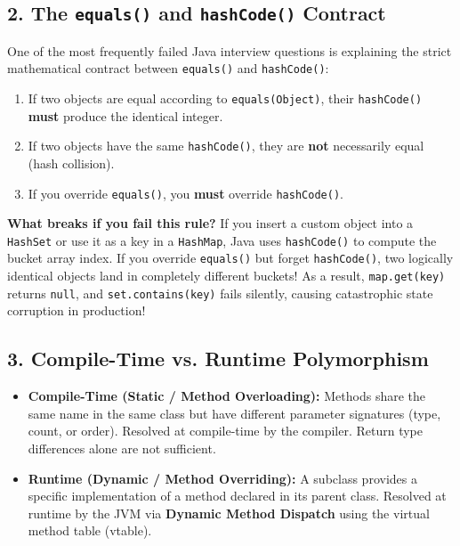\documentclass[10pt,journal,compsoc,onecolumn]{IEEEtran}
\begin{document}
\subsection{2. The \texttt{equals()} and \texttt{hashCode()} Contract}
One of the most frequently failed Java interview questions is explaining the strict mathematical contract between \texttt{equals()} and \texttt{hashCode()}:
\begin{enumerate}
    \item If two objects are equal according to \texttt{equals(Object)}, their \texttt{hashCode()} \textbf{must} produce the identical integer.
    \item If two objects have the same \texttt{hashCode()}, they are \textbf{not} necessarily equal (hash collision).
    \item If you override \texttt{equals()}, you \textbf{must} override \texttt{hashCode()}.
\end{enumerate}

\textbf{What breaks if you fail this rule?}
If you insert a custom object into a \texttt{HashSet} or use it as a key in a \texttt{HashMap}, Java uses \texttt{hashCode()} to compute the bucket array index. If you override \texttt{equals()} but forget \texttt{hashCode()}, two logically identical objects land in completely different buckets! As a result, \texttt{map.get(key)} returns \texttt{null}, and \texttt{set.contains(key)} fails silently, causing catastrophic state corruption in production!

\subsection{3. Compile-Time vs. Runtime Polymorphism}
\begin{itemize}
    \item \textbf{Compile-Time (Static / Method Overloading):} Methods share the same name in the same class but have different parameter signatures (type, count, or order). Resolved at compile-time by the compiler. Return type differences alone are not sufficient.
    \item \textbf{Runtime (Dynamic / Method Overriding):} A subclass provides a specific implementation of a method declared in its parent class. Resolved at runtime by the JVM via \textbf{Dynamic Method Dispatch} using the virtual method table (vtable).
\end{itemize}
\end{document}
